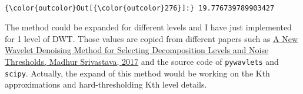 \documentclass[11pt]{article}
\begin{document}
    \begin{center}
    \end{center}
    { \hspace*{\fill} \\}
    
\begin{Verbatim}[commandchars=\\\{\}]
{\color{outcolor}Out[{\color{outcolor}276}]:} 19.776739789903427
\end{Verbatim}
            
    The method could be expanded for different levels and I have just
implemented for 1 level of DWT. Those values are copied from different
papers such as
\href{https://www.ncbi.nlm.nih.gov/pmc/articles/PMC5079185/}{A New
Wavelet Denoising Method for Selecting Decomposition Levels and Noise
Thresholds, Madhur Srivastava, 2017} and the source code of
\texttt{pywavlets} and \texttt{scipy}. Actually, the expand of this
method would be working on the Kth approximations and hard-thresholding
Kth level details.


    
    
    
    
\end{document}
